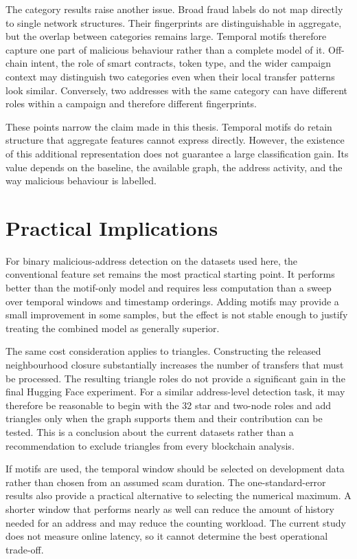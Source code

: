 \documentclass{thesisclass}
\begin{document}
The category results raise another issue. Broad fraud labels do not map directly
to single network structures. Their fingerprints are distinguishable in
aggregate, but the overlap between categories remains large. Temporal motifs
therefore capture one part of malicious behaviour rather than a complete model
of it. Off-chain intent, the role of smart contracts, token type, and the wider
campaign context may distinguish two categories even when their local transfer
patterns look similar. Conversely, two addresses with the same category can
have different roles within a campaign and therefore different fingerprints.

These points narrow the claim made in this thesis. Temporal motifs do
retain structure that aggregate features cannot express directly. However, the
existence of this additional representation does not guarantee a large
classification gain. Its value depends on the baseline, the available graph,
the address activity, and the way malicious behaviour is labelled.

\section{Practical Implications}

For binary malicious-address detection on the datasets used here, the conventional
feature set remains the most practical starting point. It performs better than
the motif-only model and requires less computation than a sweep over temporal
windows and timestamp orderings. Adding motifs may provide a small improvement
in some samples, but the effect is not stable enough to justify treating the
combined model as generally superior.

The same cost consideration applies to triangles. Constructing the released
neighbourhood closure substantially increases the number of transfers that must
be processed. The resulting triangle roles do not provide a significant gain in
the final Hugging Face experiment. For a similar address-level detection task, it
may therefore be reasonable to begin with the 32 star and two-node roles and add
triangles only when the graph supports them and their contribution can be tested.
This is a conclusion about the current datasets rather than a recommendation to
exclude triangles from every blockchain analysis.

If motifs are used, the temporal window should be selected on development data
rather than chosen from an assumed scam duration. The one-standard-error results
also provide a practical alternative to selecting the numerical maximum. A
shorter window that performs nearly as well can reduce the amount of history
needed for an address and may reduce the counting workload. The current study
does not measure online latency, so it cannot determine the best operational
trade-off.
\end{document}
